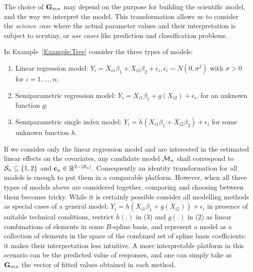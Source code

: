 The choice of ${\mathbf{G}}_{m n}$ may depend on the purpose for building the scientific model, and the way we interpret the model. This transformation 
allows us to consider  the {\it science case} where the actual parameter values and their interpretation is subject to scrutiny, or {\it use cases}  like prediction and classification problems. 

\begin{Example}
In Example~\ref{Example:Tree} consider the three types of models:
%
\begin{enumerate}
\item Linear regression model: $Y_i = X_{i1} \beta_1 + X_{i2} \beta_2 + \epsilon_i, \epsilon_i \sim N(0, \sigma^2) $ with $\sigma>0$ for $i = 1, \ldots , n$;
\item Semiparametric regression model: $Y_i = X_{i1} \beta_1 + g (X_{i2} ) + \epsilon_i$, for an unknown function $g$;
\item Semiparametric single index model: $Y_i = h( X_{i1} \beta_1 + X_{i2} \beta_2 ) + \epsilon_i $ for some unknown function $h$.
\end{enumerate}
%
If we consider only the linear regression model and are interested in the estimated linear effects on the covariates, any candidate model ${\cal{M}}_n$ shall correspond to ${\cal{S}}_n \subseteq \{ 1,2 \}$ and ${\bf{c}}_n \in {\mathbb{R}}^{2 - |{\cal{S}}_n|}$. Consequently an identity transformation for all models is enough to put them in a comparable platform. However, when all three types of models above are considered together, comparing and choosing between them becomes tricky. While it is certainly possible consider all modelling methods as special cases of a general model:  $Y_i = h( X_{i1} \beta_1 + g( X_{i2} ) ) + \epsilon_i $ in presence of suitable technical conditions, restrict $h(.)$ in (3) and $g(.)$ in (2) as linear combinations of elements in some $B$-spline basis, and represent a model as a collection of elements in the space of the combined set of spline basis coefficients: it makes their interpretation less intuitive. A more interpretable platform in this scenario can be the predicted value of responses, and one can simply take as ${\mathbf{G}}_{mn}$ the vector of fitted values obtained in each method.
\end{Example}


